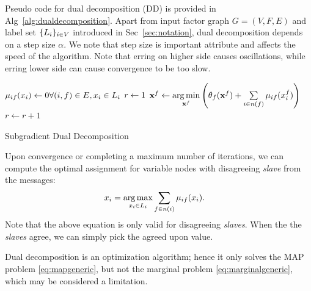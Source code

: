 \documentclass[letterpaper, 10 pt, conference]{ieeeconf} %
\providecommand{\DontPrintSemicolon}{\dontprintsemicolon} %
\DeclareMathOperator*{\argmin}{arg\,min}
\DeclareMathOperator*{\argmax}{arg\,max}
\begin{document}
Pseudo code for dual decomposition (DD) is provided in
Alg~\ref{alg:dualdecomposition}. Apart from input factor graph $G = (V, F, E)$
and label set $\{L_i\}_{i \in V}$ introduced in Sec~\ref{sec:notation}, dual
decomposition depends on a step size $\alpha$.
We note that step size is important attribute and affects the speed of the algorithm. 
Note that erring on higher side causes oscillations, while erring lower side can cause convergence to be too slow.


\begin{algorithm}
  \DontPrintSemicolon

  $\msg{i}{f}{x_i} \assign 0 \hfill \forall (i, f) \in E, x_i \in \Sx$\;
  $r \leftarrow 1$\;
   {
     {%
      $\map^f \assign \argmin\limits_{\map^f} \left( \theta_f(\map^f) + \sum\limits_{i \in n(f)}\msg{i}{f}{x^f_i} \right)$\;
    }
     {
    }
    $r \leftarrow r + 1$\;
  }
  \caption{Subgradient Dual Decomposition}
  \label{alg:dualdecomposition}
\end{algorithm}
Upon convergence or completing a maximum number of iterations, we can compute the
optimal assignment for variable nodes with disagreeing \emph{slave} from the
messages:
\begin{align}
  x_i &= \argmax\limits_{x_i \in \Sx} \sum\limits_{f \in n(i)}\msg{i}{f}{x_i}.
\end{align}
Note that the above equation is only valid for disagreeing \emph{slaves}. When the 
the \emph{slaves} agree, we can simply pick the agreed upon value.

Dual decomposition is an optimization algorithm; hence it
only solves the MAP problem \eqref{eq:mapgeneric}, but not the marginal problem
\eqref{eq:marginalgeneric}, which may be considered a limitation.
\end{document}
